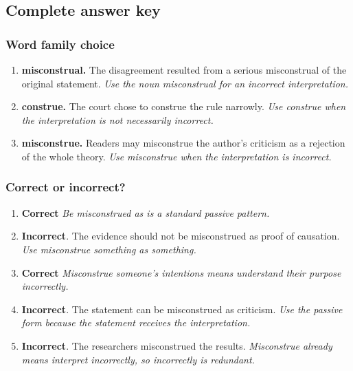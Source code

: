 \documentclass[11pt]{article}
\begin{document}
\subsection{Complete answer key}
\subsubsection{Word family choice}
\begin{enumerate}
  \item \textbf{misconstrual.} The disagreement resulted from a serious misconstrual of the original statement. \emph{Use the noun misconstrual for an incorrect interpretation.}
  \item \textbf{construe.} The court chose to construe the rule narrowly. \emph{Use construe when the interpretation is not necessarily incorrect.}
  \item \textbf{misconstrue.} Readers may misconstrue the author's criticism as a rejection of the whole theory. \emph{Use misconstrue when the interpretation is incorrect.}
\end{enumerate}

\subsubsection{Correct or incorrect?}
\begin{enumerate}
  \item \textbf{Correct} \emph{Be misconstrued as is a standard passive pattern.}
  \item \textbf{Incorrect}. The evidence should not be misconstrued as proof of causation. \emph{Use misconstrue something as something.}
  \item \textbf{Correct} \emph{Misconstrue someone's intentions means understand their purpose incorrectly.}
  \item \textbf{Incorrect}. The statement can be misconstrued as criticism. \emph{Use the passive form because the statement receives the interpretation.}
  \item \textbf{Incorrect}. The researchers misconstrued the results. \emph{Misconstrue already means interpret incorrectly, so incorrectly is redundant.}
\end{enumerate}
\end{document}
